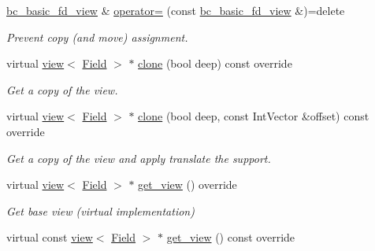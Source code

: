 \begin{DoxyCompactItemize}
\hyperlink{classUintah_1_1PhaseField_1_1detail_1_1bc__basic__fd__view}{bc\+\_\+basic\+\_\+fd\+\_\+view} \& \hyperlink{classUintah_1_1PhaseField_1_1detail_1_1bc__basic__fd__view_3_01ScalarField_3_01T_01_4_00_01STN_00_01VAR_00_01P_01_4_af7343355f3109a8891a073e9aeb7bf9a}{operator=} (const \hyperlink{classUintah_1_1PhaseField_1_1detail_1_1bc__basic__fd__view}{bc\+\_\+basic\+\_\+fd\+\_\+view} \&)=delete
\begin{DoxyCompactList}\small\item\em Prevent copy (and move) assignment. \end{DoxyCompactList}\item 
virtual \hyperlink{classUintah_1_1PhaseField_1_1detail_1_1view}{view}$<$ \hyperlink{structUintah_1_1PhaseField_1_1ScalarField}{Field} $>$ $\ast$ \hyperlink{classUintah_1_1PhaseField_1_1detail_1_1bc__basic__fd__view_3_01ScalarField_3_01T_01_4_00_01STN_00_01VAR_00_01P_01_4_aefe3932d2c0c72fe420417f7291b4c15}{clone} (bool deep) const override
\begin{DoxyCompactList}\small\item\em Get a copy of the view. \end{DoxyCompactList}\item 
virtual \hyperlink{classUintah_1_1PhaseField_1_1detail_1_1view}{view}$<$ \hyperlink{structUintah_1_1PhaseField_1_1ScalarField}{Field} $>$ $\ast$ \hyperlink{classUintah_1_1PhaseField_1_1detail_1_1bc__basic__fd__view_3_01ScalarField_3_01T_01_4_00_01STN_00_01VAR_00_01P_01_4_adc6935173c04499a5a7c769d296a97d7}{clone} (bool deep, const Int\+Vector \&offset) const override
\begin{DoxyCompactList}\small\item\em Get a copy of the view and apply translate the support. \end{DoxyCompactList}\item 
virtual \hyperlink{classUintah_1_1PhaseField_1_1detail_1_1view}{view}$<$ \hyperlink{structUintah_1_1PhaseField_1_1ScalarField}{Field} $>$ $\ast$ \hyperlink{classUintah_1_1PhaseField_1_1detail_1_1bc__basic__fd__view_3_01ScalarField_3_01T_01_4_00_01STN_00_01VAR_00_01P_01_4_a46e6a2a932a522c1ed93c7c28d728e83}{get\+\_\+view} () override
\begin{DoxyCompactList}\small\item\em Get base view (virtual implementation) \end{DoxyCompactList}\item 
virtual const \hyperlink{classUintah_1_1PhaseField_1_1detail_1_1view}{view}$<$ \hyperlink{structUintah_1_1PhaseField_1_1ScalarField}{Field} $>$ $\ast$ \hyperlink{classUintah_1_1PhaseField_1_1detail_1_1bc__basic__fd__view_3_01ScalarField_3_01T_01_4_00_01STN_00_01VAR_00_01P_01_4_aa82811e38cba5075406deb5e0f4adf62}{get\+\_\+view} () const override

\end{DoxyCompactItemize}
